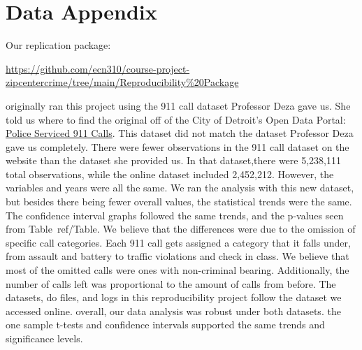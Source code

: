 \documentclass[12pt]{article}
\begin{document}
\newpage
\singlespacing
\setlength\bibsep{0pt}





\newpage
\section*{Data Appendix} \label{sec:appendixa}

Our replication package:

\href{https://github.com/ecn310/course-project-zipcentercrime/tree/main/Reproducibility%20Package}{https://github.com/ecn310/course-project-zipcentercrime/tree/main/Reproducibility\%20Package}

\vspace{10pt}


\We originally ran this project using the 911 call dataset Professor Deza gave us. She told us where to find the original off of the City of Detroit's Open Data Portal: \href{https://data.detroitmi.gov/datasets/detroitmi::police-serviced-911-calls/about}{Police Serviced 911 Calls}. This dataset did not match the dataset Professor Deza gave us completely. There were fewer observations in the 911 call dataset on the website than the dataset she provided us. In that dataset,there were 5,238,111 total observations, while the online dataset included 2,452,212. However, the variables and years were all the same. We ran the analysis with this new dataset, but besides there being fewer overall values, the statistical trends were the same. The confidence interval graphs followed the same trends, and the p-values seen from Table~ref/{Table}. We believe that the differences were due to the omission of specific call categories. Each 911 call gets assigned a category that it falls under, from assault and battery to traffic violations and check in class. We believe that most of the omitted calls were ones with non-criminal bearing. Additionally, the number of calls left was proportional to the amount of calls from before. The datasets, do files, and logs in this reproducibility project follow the dataset we accessed online. overall, our data analysis was robust under both datasets. the one sample t-tests and confidence intervals supported the same trends and significance levels. 
\end{document}
